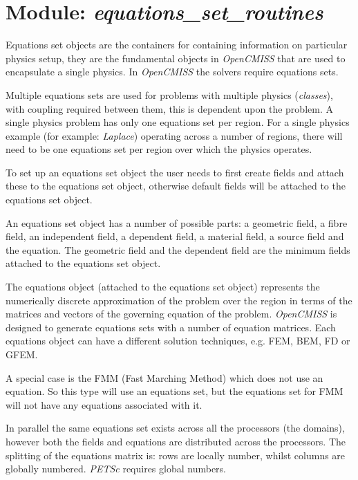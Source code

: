 \section{Module: \emph{equations\_set\_routines}}
\label{sec:equationssetroutines}

Equations set objects are the containers for containing information on 
particular physics setup, they are the fundamental objects in 
\emph{OpenCMISS} that are used to encapsulate a single physics. In 
\emph{OpenCMISS} the solvers require equations sets.

Multiple equations sets are used for problems with multiple physics 
(\emph{classes}), with coupling required between them, this is 
dependent upon the problem. A single physics problem has only one 
equations set per region. For a single physics example (for example: 
\emph{Laplace}) operating across a number of regions, there will need 
to be one equations set per region over which the physics operates.

To set up an equations set object the user needs to first create fields and
attach these to the equations set object, otherwise default fields will be 
attached to the equations set object.

An equations set object has a number of possible parts: a geometric field, 
a fibre field, an independent field, a dependent field, a material field, a 
source field and the equation. The geometric field and the dependent field 
are the minimum fields attached to the equations set object.

The equations object (attached to the equations set object) represents the 
numerically discrete approximation of the problem over the region in terms of 
the matrices and vectors of the governing equation of the problem. 
\emph{OpenCMISS} is designed to generate equations sets with a number of 
equation matrices. Each equations object can have a different solution 
techniques, e.g. FEM, BEM, FD or GFEM. 

A special case is the FMM (Fast Marching Method) which does not use an 
equation. So this type will use an equations set, but the equations set for 
FMM will not have any equations associated with it. 

In parallel the same equations set exists across all the processors (the 
domains), however both the fields and equations are distributed across the 
processors. The splitting of the equations matrix is: rows are locally number, 
whilst columns are globally numbered. \emph{PETSc} requires global numbers.


